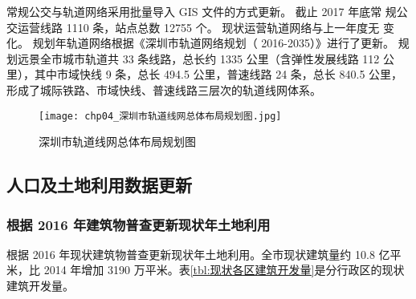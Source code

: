 常规公交与轨道网络采用批量导入 GIS 文件的方式更新。 截止 2017 年底常
规公交运营线路 1110 条，站点总数 12755 个。 现状运营轨道网络与上一年度无
变化。 规划年轨道网络根据《深圳市轨道网络规划（ 2016-2035）》进行了更新。
规划远景全市城市轨道共 33 条线路，总长约 1335 公里（含弹性发展线路 112 公
里），其中市域快线 9 条，总长 494.5 公里，普速线路 24 条，总长 840.5 公里，
形成了城际铁路、市域快线、普速线路三层次的轨道线网体系。

\begin{figure}[!htpb]
  \centering
  \texttt{[image: chp04\_深圳市轨道线网总体布局规划图.jpg]}
  \caption{深圳市轨道线网总体布局规划图\label{fig:chp04_深圳市轨道线网总体布局规划图} }
\end{figure}

\subsection{人口及土地利用数据更新}
\subsubsection{根据 2016 年建筑物普查更新现状年土地利用}
根据 2016 年现状建筑物普查更新现状年土地利用。全市现状建筑量约 10.8
亿平米，比 2014 年增加 3190 万平米。表\ref{tbl:现状各区建筑开发量}是分行政区的现状建筑开发量。

